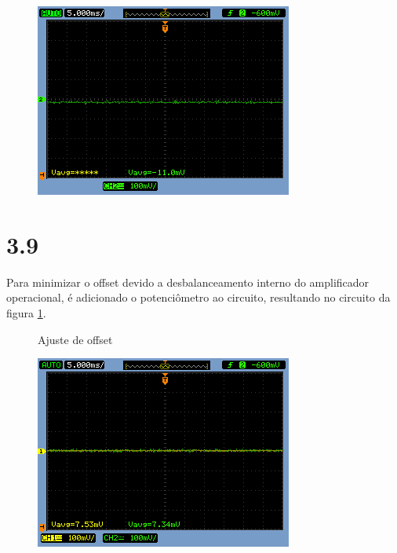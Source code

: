 \documentclass[brazil]{article}
\begin{document}
\begin{figure}[H]
\begin{centering}
\includegraphics[scale=0.5]{figuras/382cres}
\par\end{centering}

\caption{}

\end{figure}


\section*{3.9}

Para minimizar o offset devido a desbalanceamento interno do amplificador operacional, é adicionado o potenciômetro ao circuito, resultando no circuito da figura \ref{circ:5}.

\vspace{3mm}
\begin{figure}[h!]
\centerline{}
\caption{Ajuste de offset \label{circ:5}}
\end{figure}

\begin{figure}[H]
\begin{centering}
\includegraphics[scale=0.5]{figuras/39}
\par\end{centering}
\caption{}
\end{figure}
\end{document}
